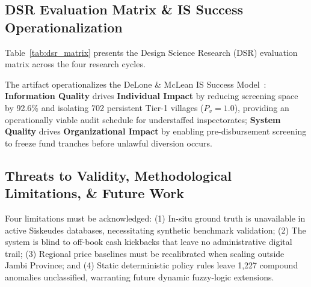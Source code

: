 \documentclass[conference]{IEEEtran}
\begin{document}
\subsection{DSR Evaluation Matrix \& IS Success Operationalization}

Table~\ref{tab:dsr_matrix} presents the Design Science Research (DSR) evaluation matrix across the four research cycles.

\begin{table}[htbp]
\centering
\caption{Design Science Research (DSR) Evaluation Matrix for Protocol 2}
\label{tab:dsr_matrix}
\setlength{\tabcolsep}{2.5pt}
\end{table}

The artifact operationalizes the DeLone \& McLean IS Success Model~\cite{ref10}: \textbf{Information Quality} drives \textbf{Individual Impact} by reducing screening space by 92.6\% and isolating 702 persistent Tier-1 villages ($P_v = 1.0$), providing an operationally viable audit schedule for understaffed inspectorates; \textbf{System Quality} drives \textbf{Organizational Impact} by enabling pre-disbursement screening to freeze fund tranches before unlawful diversion occurs.

\subsection{Threats to Validity, Methodological Limitations, \& Future Work}

Four limitations must be acknowledged: (1) In-situ ground truth is unavailable in active Siskeudes databases, necessitating synthetic benchmark validation; (2) The system is blind to off-book cash kickbacks that leave no administrative digital trail; (3) Regional price baselines must be recalibrated when scaling outside Jambi Province; and (4) Static deterministic policy rules leave 1,227 compound anomalies unclassified, warranting future dynamic fuzzy-logic extensions.
\end{document}
